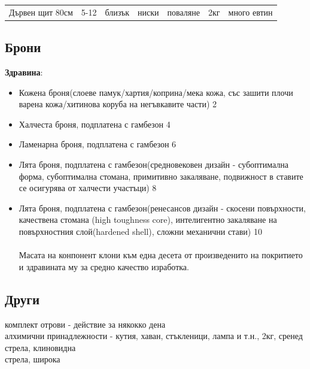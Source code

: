 \begin{tabular}{p{2cm} | p{2cm} | p{2cm} | p{2cm} | p{2cm} | p{2cm} | p{2cm}}
Дървен щит 80см       & 5-12                 & близък     & ниски      & поваляне       & 2кг   & много евтин  \\
\end{tabular}

\subsection{Брони}
\textbf{Здравина}:
\begin{itemize}[topsep=-0cm, partopsep=0cm, parsep=0cm, itemsep=0cm]
\item{Кожена броня(слоеве памук/хартия/коприна/мека кожа, със зашити плочи варена кожа/хитинова коруба на негъвкавите части) 2}
\item{Халчеста броня, подплатена с гамбезон 4}
\item{Ламенарна броня, подплатена с гамбезон 6}
\item{Лята броня, подплатена с гамбезон(средновековен дизайн - субоптимална форма, субоптимална стомана, примитивно закаляване, подвижност в ставите се осигурява от халчести участъци) 8}
\item{Лята броня, подплатена с гамбезон(ренесансов дизайн - скосени повърхности, качествена стомана (high toughness core),  интелигентно закаляване на повърхностния слой(hardened shell), сложни механични стави) 10}
\\
\\
Масата на конпонент клони към една десета от произведенито на покритието и здравината му за средно качество изработка.
\end{itemize}

\subsection{Други}
комплект отрови - действие за някокко дена \\
алхимични принадлежности - кутия, хаван, стъкленици, лампа и т.н., 2кг, сренед  \\
стрела, клиновидна  \\
стрела, широка  \\
